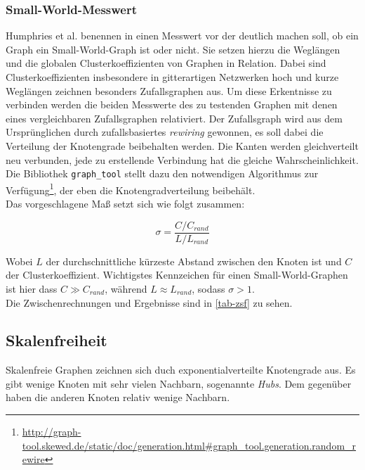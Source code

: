 \documentclass[11pt, a4paper]{article}
\begin{document}
\subsubsection{Small-World-Messwert}
Humphries et al. benennen in \cite{Humphries2006} einen Messwert vor der deutlich
machen soll, ob ein Graph ein Small-World-Graph ist oder nicht. Sie setzen hierzu
die Weglängen und die globalen Clusterkoeffizienten von Graphen in Relation. 
Dabei sind Clusterkoeffizienten insbesondere in gitterartigen Netzwerken hoch und
kurze Weglängen zeichnen besonders Zufallsgraphen aus. Um diese Erkentnisse zu
verbinden werden die beiden Messwerte des zu testenden Graphen mit denen eines
vergleichbaren Zufallsgraphen relativiert. Der Zufallsgraph wird aus dem 
Ursprünglichen durch zufallsbasiertes \emph{rewiring} gewonnen, es soll dabei die
Verteilung der Knotengrade beibehalten werden. Die Kanten werden gleichverteilt
neu verbunden, jede zu erstellende Verbindung hat die gleiche Wahrscheinlichkeit.
Die Bibliothek \texttt{graph\_tool} stellt dazu den notwendigen Algorithmus zur 
Verfügung\footnote{\url{http://graph-tool.skewed.de/static/doc/generation.html\#graph_tool.generation.random_rewire}},
der eben die Knotengradverteilung beibehält.\\
Das vorgeschlagene Maß setzt sich wie folgt zusammen:

$$
\sigma = \frac{C/C_{rand}}{ L/L_{rand}}
$$

Wobei $L$ der durchschnittliche kürzeste Abstand zwischen den Knoten ist und $C$
der Clusterkoeffizient. Wichtigstes Kennzeichen für einen Small-World-Graphen
ist hier dass $C \gg C_{rand}$, während $L \approx L_{rand}$, sodass $\sigma > 1$.\\
Die Zwischenrechnungen und Ergebnisse sind in \ref{tab-zsf} zu sehen.

\subsection{Skalenfreiheit}
Skalenfreie Graphen zeichnen sich duch exponentialverteilte Knotengrade aus.
Es gibt wenige Knoten mit sehr vielen Nachbarn, sogenannte \emph{Hubs}.
Dem gegenüber haben die anderen Knoten relativ wenige Nachbarn. 

\end{document}
